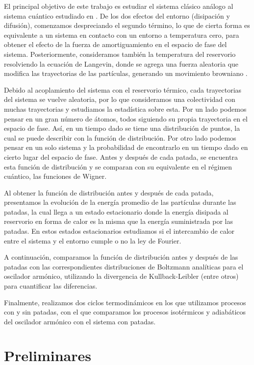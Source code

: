\documentclass[letterpaper,12pt,oneside]{book}
\begin{document}
		El principal objetivo de este trabajo es estudiar el sistema clásico análogo al sistema cuántico estudiado en \cite{2017Prado}. De los dos efectos del entorno (disipación y difusión), comenzamos despreciando el segundo término, lo que de cierta forma es equivalente a un sistema en contacto con un entorno a temperatura cero, para obtener el efecto de la fuerza de amortiguamiento en el espacio de fase del sistema. Posteriormente, consideramos también la temperatura del reservorio resolviendo la ecuación de Langevin, donde se agrega una fuerza aleatoria que modifica las trayectorias de las partículas, generando un movimiento browniano \cite{1998LangevinEquation}.
		
		Debido al acoplamiento del sistema con el reservorio térmico, cada trayectorias del sistema se vuelve aleatoria, por lo que consideramos una colectividad con muchas trayectorias y estudiamos la estadística sobre esta. Por un lado podemos pensar en un gran número de átomos, todos siguiendo su propia trayectoria en el espacio de fase. Así, en un tiempo dado se tiene una distribución de puntos, la cual se puede describir con la función de distribución. Por otro lado podemos pensar en un solo sistema y la probabilidad de encontrarlo en un tiempo dado en cierto lugar del espacio de fase. Antes y después de cada patada, se encuentra esta función de distribución y se comparan con su equivalente en el régimen cuántico, las funciones de Wigner.
		
		Al obtener la función de distribución antes y después de cada patada, presentamos la evolución de la energía promedio de las partículas durante las patadas, la cual llega a un estado estacionario donde la energía disipada al reservorio en forma de calor es la misma que la energía suministrada por las patadas. En estos estados estacionarios estudiamos si el intercambio de calor entre el sistema y el entorno cumple o no la ley de Fourier.
		
		A continuación, comparamos la función de distribución antes y después de las patadas con las correspondientes distribuciones de Boltzmann analíticas para el oscilador arm\'onico, utilizando la divergencia de Kullback-Leibler (entre otros) para cuantificar las diferencias.
		
		Finalmente, realizamos dos ciclos termodinámicos en los que utilizamos procesos con y sin patadas, con el que comparamos los procesos isotérmicos y adiabáticos del oscilador armónico con el sistema con patadas.
	\chapter{Preliminares}
	
\end{document}
